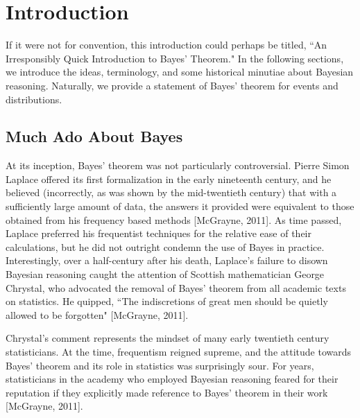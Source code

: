 \documentclass[12pt,twoside]{reedthesis}
\begin{document}
    \chapter*{Introduction}

	If it were not for convention, this introduction could perhaps be titled, ``An Irresponsibly Quick Introduction to Bayes' Theorem." In the following sections, we introduce the ideas, terminology, and some historical minutiae about Bayesian reasoning. Naturally, we provide a statement of Bayes' theorem for events and distributions.
	\section{Much Ado About Bayes}
	At its inception, Bayes' theorem was not particularly controversial. Pierre Simon Laplace offered its first formalization in the early nineteenth century, and he believed (incorrectly, as was shown by the mid-twentieth century) that with a sufficiently large amount of data, the answers it provided were equivalent to those obtained from his frequency based methods [McGrayne, 2011]. 
	As time passed, Laplace preferred his frequentist techniques for the relative ease of their calculations, but he did not outright condemn the use of Bayes in practice. Interestingly, over a half-century after his death, Laplace's failure to disown Bayesian reasoning caught the attention of Scottish mathematician George Chrystal, who advocated the removal of Bayes' theorem from all academic texts on statistics. He quipped, ``The indiscretions of great men should be quietly allowed to be forgotten" [McGrayne, 2011].
	
	Chrystal's comment represents the mindset of many early twentieth century statisticians. At the time, frequentism reigned supreme, and the attitude towards Bayes' theorem and its role in statistics was surprisingly sour. For years, statisticians in the academy who employed Bayesian reasoning feared for their reputation if they explicitly made reference to Bayes' theorem in their work [McGrayne, 2011]. 
	
\end{document}
